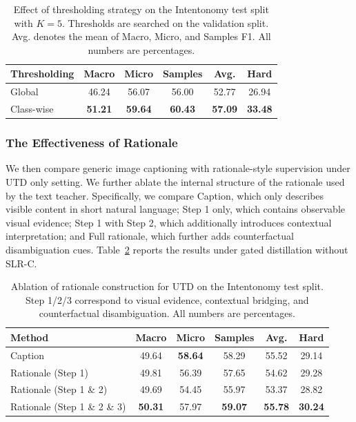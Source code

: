 \begin{table}[t]
\centering
\caption{Effect of thresholding strategy on the Intentonomy test split with $K=5$. Thresholds are searched on the validation split. Avg. denotes the mean of Macro, Micro, and Samples F1. All numbers are percentages.}
\label{tab:thresholding_test}
\begin{tabular}{lccccc}
\hline
Thresholding & Macro & Micro & Samples & Avg. & Hard \\
\hline
Global & 46.24 & 56.07 & 56.00 & 52.77 & 26.94 \\
Class-wise & \textbf{51.21} & \textbf{59.64} & \textbf{60.43} & \textbf{57.09} & \textbf{33.48} \\
\hline
\end{tabular}
\end{table}

\subsubsection{The Effectiveness of Rationale}

We then compare generic image captioning with rationale-style supervision under UTD only setting. We further ablate the internal structure of the rationale used by the text teacher. Specifically, we compare Caption, which only describes visible content in short natural language; Step 1 only, which contains observable visual evidence; Step 1 with Step 2, which additionally introduces contextual interpretation; and Full rationale, which further adds counterfactual disambiguation cues. Table~\ref{tab:rationale_ablation} reports the results under gated distillation without SLR-C.
\begin{table}[t]
\centering
\caption{Ablation of rationale construction for UTD on the Intentonomy test split. Step 1/2/3 correspond to visual evidence, contextual bridging, and counterfactual disambiguation. All numbers are percentages.}
\label{tab:rationale_ablation}
\begin{tabular}{lccccc}
\hline
Method & Macro & Micro & Samples & Avg. & Hard \\
\hline
Caption & 49.64 & \textbf{58.64} & 58.29 & 55.52 & 29.14 \\
Rationale (Step 1) & 49.81 & 56.39 & 57.65 & 54.62 & 29.28 \\
Rationale (Step 1 \& 2) & 49.69 & 54.45 & 55.97 & 53.37 & 28.82 \\
Rationale (Step 1 \& 2 \& 3) & \textbf{50.31} & 57.97 & \textbf{59.07} & \textbf{55.78} & \textbf{30.24} \\
\hline
\end{tabular}
\end{table}

